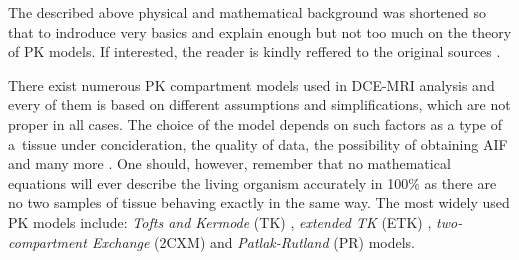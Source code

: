 The described above physical and mathematical background was shortened so that to indroduce very basics and explain enough but not too much on the theory of PK models. If interested, the reader is kindly reffered to the original sources \cite{sourbron2011scope, thesis}. 

There exist numerous PK compartment models used in DCE-MRI analysis and every of them is based on different assumptions and simplifications, which are not proper in all cases. The choice of the model depends on such factors as a type of a~tissue under concideration, the quality of data, the possibility of obtaining AIF and many more \cite{khalifa2014models}. One should, however, remember that no mathematical equations will ever describe the living organism accurately in 100\% as there are no two samples of tissue behaving exactly in the same way. The most widely used PK models include: \textit{Tofts and Kermode} (TK) \cite{tofts1991measurement}, \textit{extended TK} (ETK) \cite{tofts1997modeling}, \textit{two-compartment Exchange} (2CXM) \cite{khalifa2014models} and \textit{Patlak-Rutland} (PR) \cite{patlak1983graphical} models.  

